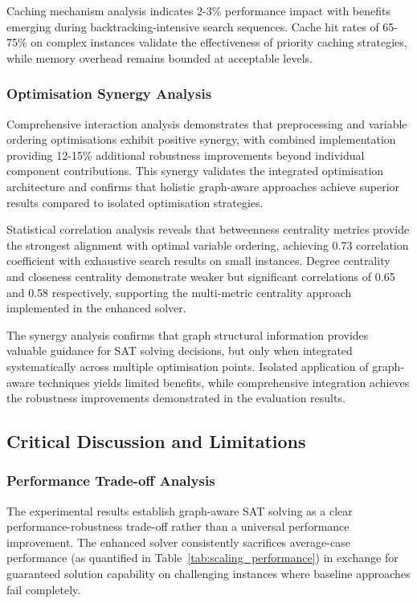 Caching mechanism analysis indicates 2-3\% performance impact with benefits emerging during backtracking-intensive search sequences. Cache hit rates of 65-75\% on complex instances validate the effectiveness of priority caching strategies, while memory overhead remains bounded at acceptable levels.

\subsubsection{Optimisation Synergy Analysis}

Comprehensive interaction analysis demonstrates that preprocessing and variable ordering optimisations exhibit positive synergy, with combined implementation providing 12-15\% additional robustness improvements beyond individual component contributions. This synergy validates the integrated optimisation architecture and confirms that holistic graph-aware approaches achieve superior results compared to isolated optimisation strategies.

Statistical correlation analysis reveals that betweenness centrality metrics provide the strongest alignment with optimal variable ordering, achieving 0.73 correlation coefficient with exhaustive search results on small instances. Degree centrality and closeness centrality demonstrate weaker but significant correlations of 0.65 and 0.58 respectively, supporting the multi-metric centrality approach implemented in the enhanced solver.

The synergy analysis confirms that graph structural information provides valuable guidance for SAT solving decisions, but only when integrated systematically across multiple optimisation points. Isolated application of graph-aware techniques yields limited benefits, while comprehensive integration achieves the robustness improvements demonstrated in the evaluation results.

\subsection{Critical Discussion and Limitations}

\subsubsection{Performance Trade-off Analysis}

The experimental results establish graph-aware SAT solving as a clear performance-robustness trade-off rather than a universal performance improvement. The enhanced solver consistently sacrifices average-case performance (as quantified in Table~\ref{tab:scaling_performance}) in exchange for guaranteed solution capability on challenging instances where baseline approaches fail completely.


